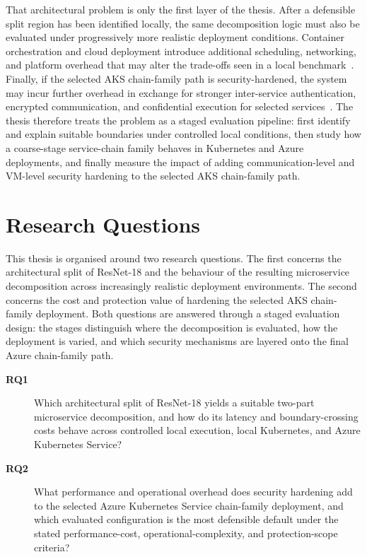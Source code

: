 That architectural problem is only the first layer of the thesis. After a defensible split region has been identified locally, the same decomposition logic must also be evaluated under progressively more realistic deployment conditions. Container orchestration and cloud deployment introduce additional scheduling, networking, and platform overhead that may alter the trade-offs seen in a local benchmark~\cite{managed_k8s_perf,noise_in_clouds}. Finally, if the selected AKS chain-family path is security-hardened, the system may incur further overhead in exchange for stronger inter-service authentication, encrypted communication, and confidential execution for selected services~\cite{meshinsight_socc23,yan2023_cvm_overheads}. The thesis therefore treats the problem as a staged evaluation pipeline: first identify and explain suitable boundaries under controlled local conditions, then study how a coarse-stage service-chain family behaves in Kubernetes and Azure deployments, and finally measure the impact of adding communication-level and VM-level security hardening to the selected AKS chain-family path.

\section{Research Questions}
This thesis is organised around two research questions. The first concerns the architectural split of ResNet-18 and the behaviour of the resulting microservice decomposition across increasingly realistic deployment environments. The second concerns the cost and protection value of hardening the selected AKS chain-family deployment. Both questions are answered through a staged evaluation design: the stages distinguish where the decomposition is evaluated, how the deployment is varied, and which security mechanisms are layered onto the final Azure chain-family path.

\begin{description}
    \item[\textbf{RQ1}]\label{rq:rq1} Which architectural split of ResNet-18 yields a suitable two-part microservice decomposition, and how do its latency and boundary-crossing costs behave across controlled local execution, local Kubernetes, and Azure Kubernetes Service?
    \item[\textbf{RQ2}]\label{rq:rq2} What performance and operational overhead does security hardening add to the selected Azure Kubernetes Service chain-family deployment, and which evaluated configuration is the most defensible default under the stated performance-cost, operational-complexity, and protection-scope criteria?
\end{description}

